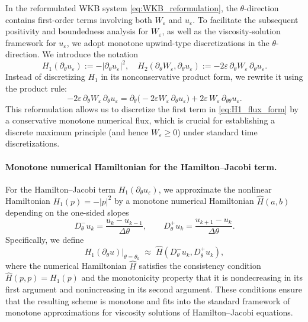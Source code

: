 \documentclass[11pt, dina4, amsfont12]{article}
\begin{document}
In the reformulated WKB system \eqref{eq:WKB_reformulation}, the
$\theta$-direction contains first-order terms involving both
$W_\varepsilon$ and $u_\varepsilon$.
To facilitate the subsequent positivity and boundedness analysis for
$W_\varepsilon$, as well as the viscosity-solution framework for
$u_\varepsilon$, we adopt monotone upwind-type discretizations in the
$\theta$-direction.
We introduce the notation
\[
H_1(\partial_\theta u_\varepsilon)
:= -|\partial_\theta u_\varepsilon|^2,
\quad
H_2(\partial_\theta W_\varepsilon,\partial_\theta u_\varepsilon)
:= -2\varepsilon\,\partial_\theta W_\varepsilon\,\partial_\theta u_\varepsilon.
\]
Instead of discretizing $H_1$ in its nonconservative product form, we rewrite it
using the product rule:
\begin{equation}\label{eq:H1_flux_form}
-2\varepsilon\, \partial_\theta W_\varepsilon\, \partial_\theta u_\varepsilon
=
\partial_\theta\!\bigl(-2\varepsilon W_\varepsilon\,\partial_\theta u_\varepsilon\bigr)
+ 2\varepsilon\, W_\varepsilon\, \partial_{\theta\theta}u_\varepsilon .
\end{equation}
This reformulation allows us to discretize the first term in
\eqref{eq:H1_flux_form} by a conservative monotone numerical flux, which is
crucial for establishing a discrete maximum principle (and hence
$W_\varepsilon\ge 0$) under standard time discretizations.

\paragraph{Monotone numerical Hamiltonian for the Hamilton--Jacobi term.}
For the Hamilton--Jacobi term $H_1(\partial_\theta u_\varepsilon)$, we approximate
the nonlinear Hamiltonian $H_1(p)=-|p|^2$ by a monotone numerical Hamiltonian
$\widehat{H}(a,b)$ depending on the one-sided slopes
\[
D_\theta^- u_k=\frac{u_k-u_{k-1}}{\Delta\theta},
\qquad
D_\theta^+ u_k=\frac{u_{k+1}-u_k}{\Delta\theta}.
\]
Specifically, we define
\[
H_1(\partial_\theta u)\Big|_{\theta=\theta_k}
\;\approx\;
\hat{H} \left(D_\theta^- u_k, D_\theta^+ u_k\right),
\]
where the numerical Hamiltonian $\widehat{H}$ satisfies the consistency
condition $\widehat{H}(p,p)=H_1(p)$ and the monotonicity property that it
is nondecreasing in its first argument and nonincreasing in its second argument.
These conditions ensure that the resulting scheme is monotone and fits into the
standard framework of monotone approximations for viscosity solutions of
Hamilton--Jacobi equations.
\end{document}
